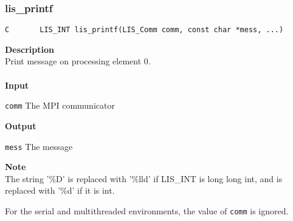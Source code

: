 \documentclass[a4paper]{article}
\newcommand{\namelistlabel}[1]{\mbox{#1}\hfill}
\newenvironment{namelist}[1]{%
\begin{list}{}
  {\let\makelabel\namelistlabel
  \settowidth{\labelwidth}{#1}
  \setlength{\leftmargin}{1.1\labelwidth}}
  }{%
\end{list}}
\begin{document}
\subsubsection{lis\_printf}
\begin{screen}
\verb|C       LIS_INT lis_printf(LIS_Comm comm, const char *mess, ...)|
\end{screen}
{\bf Description}\\
\indent
Print message on processing element 0.
\\ \\
\noindent
{\bf Input}
\begin{namelist}{XXXXXXXXXXXXXXXXXXXX}
\item[\tt comm] The MPI communicator
\end{namelist}
{\bf Output}
\begin{namelist}{XXXXXXXXXXXXXXXXXXXX}
\item[\tt mess] The message
\end{namelist}
{\bf Note}\\
\indent
The string '\%D' is replaced with '\%lld' if LIS\_INT is long long int, and is replaced with '\%d' if it is int.

For the serial and multithreaded environments, the value of {\tt comm} is ignored. 
\end{document}
